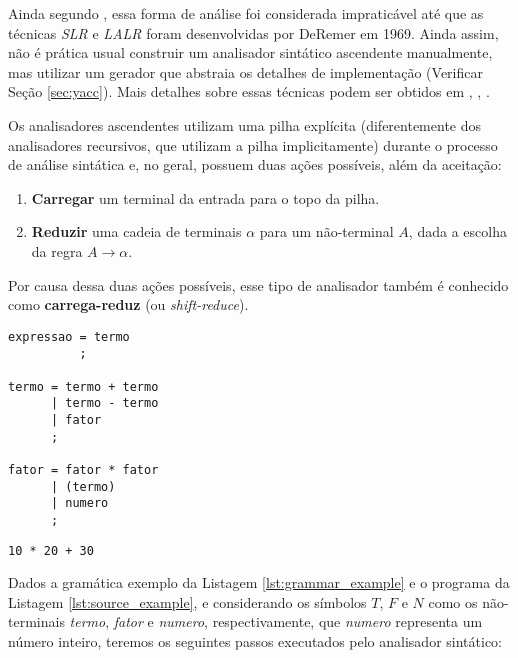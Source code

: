 Ainda segundo , essa forma de análise foi
considerada impraticável até que as técnicas \emph{SLR} e \emph{LALR}
foram desenvolvidas por DeRemer em 1969. Ainda assim, não é prática usual
construir um analisador sintático ascendente manualmente, mas utilizar um
gerador que abstraia os detalhes de implementação (Verificar Seção
\ref{sec:yacc}). Mais detalhes sobre essas técnicas podem ser obtidos em
, , .

Os analisadores ascendentes utilizam uma pilha explícita (diferentemente dos
analisadores recursivos, que utilizam a pilha implicitamente) durante o processo de
análise sintática e, no geral, possuem duas ações possíveis, além da aceitação:

\begin{enumerate}
	\item \textbf{Carregar} um terminal da entrada para o topo da pilha.
	\item \textbf{Reduzir} uma cadeia de terminais $\alpha$ para um não-terminal
	      $A$, dada a escolha da regra $A \rightarrow \alpha$.
\end{enumerate}

Por causa dessa duas ações possíveis, esse tipo de analisador também é
conhecido como \textbf{carrega-reduz} (ou \emph{shift-reduce}).

\begin{lstlisting}[label=lst:grammar_example, caption=Gramática Exemplo]
expressao = termo
          ;

termo = termo + termo
      | termo - termo
      | fator
      ;

fator = fator * fator
      | (termo)
      | numero
      ;
\end{lstlisting}

\begin{lstlisting}[label=lst:source_example, caption=Programa Exemplo]
10 * 20 + 30
\end{lstlisting}

Dados a gramática exemplo da Listagem \ref{lst:grammar_example} e o programa
da Listagem \ref{lst:source_example}, e considerando os símbolos $T$, $F$
e $N$ como os não-terminais \emph{termo}, \emph{fator} e \emph{numero},
respectivamente, que \emph{numero} representa um número inteiro, teremos os
seguintes passos executados pelo analisador sintático:

